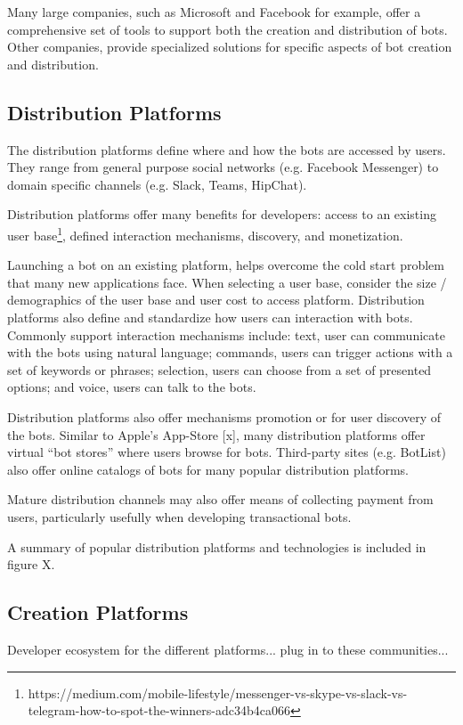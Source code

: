 \documentclass{sig-alternate}
\begin{document}
	Many large companies, such as Microsoft and Facebook for example, offer a comprehensive set of tools to support both the creation and distribution of bots. Other companies, provide specialized solutions for specific aspects of bot creation and distribution. 

	\subsection{Distribution Platforms}
	The distribution platforms define where and how the bots are accessed by users. They range from general purpose social networks (e.g. Facebook Messenger) to domain specific channels (e.g. Slack, Teams, HipChat).  

	Distribution platforms offer many benefits for developers: access to an existing user base\footnote{https://medium.com/mobile-lifestyle/messenger-vs-skype-vs-slack-vs-telegram-how-to-spot-the-winners-adc34b4ca066\label{How_to_spot_the_winners}}, defined interaction mechanisms, discovery, and monetization.  

	Launching a bot on an existing platform, helps overcome the cold start problem that many new applications face. When selecting a user base, consider the size / demographics of the user base and user cost to access platform. Distribution platforms also define and standardize how users can interaction with bots.  Commonly support interaction mechanisms include: text, user can communicate with the bots using natural language; commands, users can trigger actions with a set of keywords or phrases; selection, users can choose from a set of presented options; and voice, users can talk to the bots.

	Distribution platforms also offer mechanisms promotion or for user discovery of the bots. Similar to Apple's App-Store [x], many distribution platforms offer virtual ``bot stores'' where users browse for bots. Third-party sites (e.g. BotList) also offer online catalogs of bots for many popular distribution platforms. 

	Mature distribution channels may also offer means of collecting payment from users, particularly usefully when developing transactional bots.

	A summary of popular distribution platforms and technologies is included in figure X.

	\subsection{Creation Platforms}
	Developer ecosystem for the different platforms...  plug in to these communities...
\end{document}
